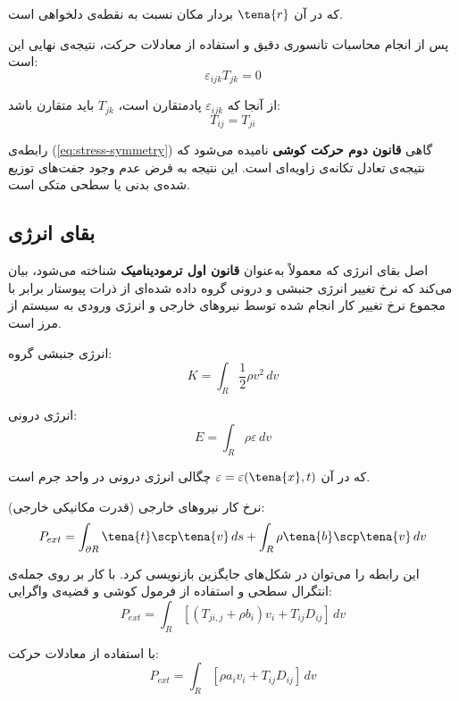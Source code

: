 که در آن $\tena{r}$ بردار مکان نسبت به نقطه‌ی دلخواهی است.

پس از انجام محاسبات تانسوری دقیق و استفاده از معادلات حرکت، نتیجه‌ی نهایی این است:
\begin{equation}
	\varepsilon_{ijk} T_{jk} = 0
\end{equation}

از آنجا که $\varepsilon_{ijk}$ پادمتقارن است، $T_{jk}$ باید متقارن باشد:
\begin{equation}
	T_{ij} = T_{ji}
\end{equation}

رابطه‌ی (\ref{eq:stress-symmetry}) گاهی \textbf{قانون دوم حرکت کوشی} نامیده می‌شود که نتیجه‌ی تعادل تکانه‌ی زاویه‌ای است. این نتیجه به فرض عدم وجود جفت‌های توزیع شده‌ی بدنی یا سطحی متکی است.

\subsection{بقای انرژی}

اصل بقای انرژی که معمولاً به‌عنوان \textbf{قانون اول ترمودینامیک} شناخته می‌شود، بیان می‌کند که نرخ تغییر انرژی جنبشی و درونی گروه داده شده‌ای از ذرات پیوستار برابر با مجموع نرخ تغییر کار انجام شده توسط نیروهای خارجی و انرژی ورودی به سیستم از مرز است.

انرژی جنبشی گروه:
\begin{equation}
	K = \int_R \frac{1}{2} \rho v^2 \, dv
\end{equation}

انرژی درونی:
\begin{equation}
	E = \int_R \rho \varepsilon \, dv
\end{equation}

که در آن $\varepsilon = \varepsilon(\tena{x}, t)$ چگالی انرژی درونی در واحد جرم است.

نرخ کار نیروهای خارجی (قدرت مکانیکی خارجی):
\begin{equation}
	P_{ext} = \int_{\partial R} \tena{t} \scp \tena{v} \, ds + \int_R \rho \tena{b} \scp \tena{v} \, dv
\end{equation}

این رابطه را می‌توان در شکل‌های جایگزین بازنویسی کرد. با کار بر روی جمله‌ی انتگرال سطحی و استفاده از فرمول کوشی و قضیه‌ی واگرایی:
\begin{equation}
	P_{ext} = \int_R [(T_{ji,j} + \rho b_i) v_i + T_{ij} D_{ij}] \, dv
\end{equation}

با استفاده از معادلات حرکت:
\begin{equation}
	P_{ext} = \int_R [\rho a_i v_i + T_{ij} D_{ij}] \, dv
\end{equation}

